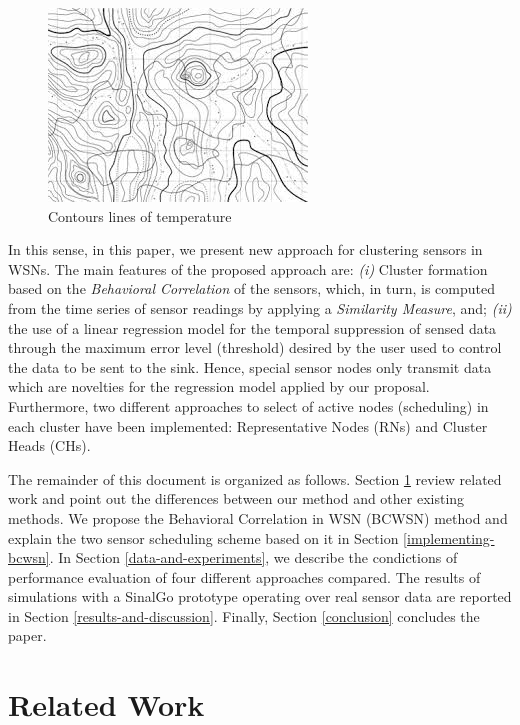 \documentclass[conference]{IEEEtran}
\begin{document}
\begin{figure}[!htb]
\centering
	\includegraphics[scale=0.7]{I2.png}
    \caption{Contours lines of temperature}
    \label{fig:contour_lines}
\end{figure}

In this sense, in this paper, we present new approach for clustering sensors in
WSNs. The main features of the proposed approach are: {\it (i)} Cluster
formation based on the \textit{Behavioral Correlation} of the sensors, which, in
turn, is computed from the time series of sensor readings by applying a
\textit{Similarity Measure}, and; {\it (ii)} the use of a linear regression
model for the temporal suppression of sensed data through the maximum error
level (threshold) desired by the user used to control the data to be sent to the
sink. Hence, special sensor nodes only transmit data which are novelties for the
regression model applied by our proposal. Furthermore, two different approaches
to select of active nodes (scheduling) in each cluster have been implemented:
Representative Nodes (RNs) and Cluster Heads (CHs).


The remainder of this document is organized as follows. Section
\ref{related-work} review related work and point out the differences between our
method and other existing methods. We propose the Behavioral Correlation in WSN
(BCWSN) method and explain the two sensor scheduling scheme based on it in
Section \ref{implementing-bcwsn}. In Section \ref{data-and-experiments}, we
describe the condictions of performance evaluation of four different approaches
compared. The results of simulations with a SinalGo \cite{Sinalgo2007} prototype
operating over real sensor data are reported in Section
\ref{results-and-discussion}. Finally, Section \ref{conclusion} concludes the
paper.


\section{Related Work}
\label{related-work}
\end{document}
